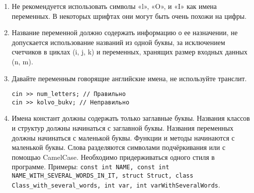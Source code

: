 \documentclass[10pt]{article}
\begin{document}
\begin{enumerate}

\item Не рекомендуется использовать символы «l», «O», и «I» как имена переменных. В некоторых шрифтах они могут быть очень похожи на цифры.

\item Название переменной должно содержать информацию о ее назначении, не допускается использование названий из одной буквы, за исключением счетчиков в циклах (i, j, k) и переменных, хранящих размер входных данных (n, m).

\item Давайте переменным говорящие английские имена, не используйте транслит.

\begin{lstlisting}
cin >> num_letters; // Правильно
cin >> kolvo_bukv; // Неправильно
\end{lstlisting}

\item Имена констант должны содержать только заглавные буквы. Названия классов и структур должны начинаться с заглавной буквы. Названия
переменных должны начинаться с маленькой буквы. Функции и методы начинаются с маленькой буквы. Слова разделяются символами подчёркивания или с помощью CamelCase. Необходимо придерживаться одного
стиля в программе.
Примеры: \texttt{const int NAME, const int NAME\_WITH\_SEVERAL\_WORDS\_IN\_IT, struct Struct, class Class\_with\_several\_words, int var, int varWithSeveralWords}.

\end{enumerate}
\end{document}
